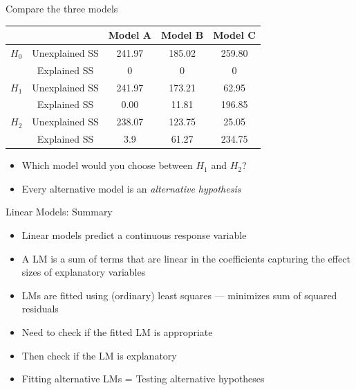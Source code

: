 \documentclass[xcolor=x11names,handout,compress]{beamer}
\renewcommand{\(}{\begin{columns}}
\renewcommand{\)}{\end{columns}}
\newcommand{\<}[1]{\begin{column}{#1}}
\renewcommand{\>}{\end{column}}
\begin{document}

\begin{frame}{Compare the three models}

\begin{table}[htdp]
	\begin{center}
		\begin{tabular}{ccccc}
				&  & Model A & Model B & Model C \\
		\hline
		$H_0 $ & Unexplained SS & 241.97 & 185.02 & 259.80 \\
		       & Explained SS   & 0      & 0      &    0   \\
		$H_1 $ & Unexplained SS & 241.97 & 173.21 & 62.95 \\
		       & Explained SS   & 0.00  & 11.81 & 196.85 \\
		$H_2 $ & Unexplained SS & 238.07 & 123.75 & 25.05 \\
		       & Explained SS   & 3.9  & 61.27 & 234.75 \\
        \hline
    \end{tabular}
\end{center}
\end{table}

\begin{itemize}[<+->]\itemsep6pt
    \item Which model would you choose between $H_1$ and $H_2$?
    \item Every alternative model is an {\it alternative hypothesis}
\end{itemize}
    
\end{frame}


\begin{frame}{Linear Models: Summary}

    \begin{itemize}\itemsep12pt
        \item Linear models predict a continuous response variable
        \item A LM is a sum of terms that are linear in the coefficients capturing the effect sizes of explanatory variables
        \item LMs are fitted using (ordinary) least squares --- minimizes sum of squared residuals
        \item Need to check if the fitted LM is appropriate
        \item Then check if the LM is explanatory
        \item Fitting alternative LMs = Testing alternative hypotheses
    \end{itemize}
    
    \end{frame}
    
\end{document}
